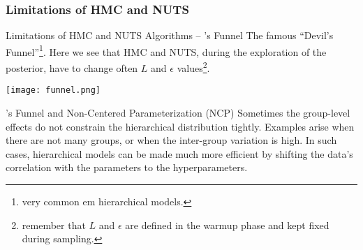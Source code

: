 \subsubsection{Limitations of HMC and NUTS}
\begin{frame}{Limitations of HMC and NUTS Algorithms -- \textcite{nealSliceSampling2003}'s Funnel}
	The famous ``Devil's Funnel''\footnote{very common em hierarchical models.}.
	Here we see that HMC and NUTS, during the exploration of the posterior,
	have to change often $L$ and $\epsilon$ values\footnote{
		remember that $L$ and $\epsilon$ are defined in the warmup phase and kept fixed during sampling.}.




	\centering
	\texttt{[image: funnel.png]}
\end{frame}

\begin{frame}{\textcite{nealSliceSampling2003}'s Funnel and Non-Centered Parameterization (NCP)}
	Sometimes the group-level effects do not constrain the hierarchical distribution tightly.
	\vfill
	Examples arise when there are not many groups,
	or when the inter-group variation is high.
	\vfill
	In such cases, hierarchical models can be made much more efficient by shifting the
	data's correlation with the parameters to the hyperparameters.
\end{frame}

